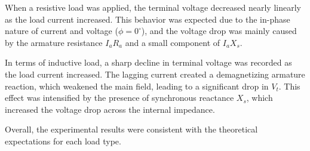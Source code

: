 \documentclass[a4paper,12pt]{article}
\begin{document}
When a resistive load was applied, the terminal voltage decreased nearly linearly as the load current increased. This behavior was expected due to the in-phase nature of current and voltage (\( \phi = 0^\circ \)), and the voltage drop was mainly caused by the armature resistance \( I_aR_a \) and a small component of \( I_aX_s \).

In terms of inductive load, a sharp decline in terminal voltage was recorded as the load current increased. The lagging current created a demagnetizing armature reaction, which weakened the main field, leading to a significant drop in \( V_t \). This effect was intensified by the presence of synchronous reactance \( X_s \), which increased the voltage drop across the internal impedance.

Overall, the experimental results were consistent with the theoretical expectations for each load type.

	
\end{document}
